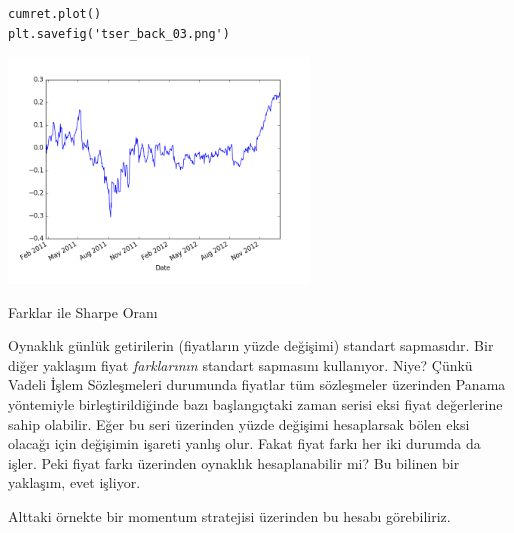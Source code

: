 \documentclass[12pt,fleqn]{article}\usepackage{../../common}
\begin{document}
\begin{verbatim}
cumret.plot()
plt.savefig('tser_back_03.png')
\end{verbatim}

\includegraphics[height=6cm]{tser_back_03.png}

Farklar ile Sharpe Oranı

Oynaklık günlük getirilerin (fiyatların yüzde değişimi) standart sapmasıdır. Bir
diğer yaklaşım fiyat {\em farklarının} standart sapmasını kullanıyor. Niye?
Çünkü Vadeli İşlem Sözleşmeleri durumunda fiyatlar tüm sözleşmeler üzerinden
Panama yöntemiyle birleştirildiğinde bazı başlangıçtaki zaman serisi eksi fiyat
değerlerine sahip olabilir. Eğer bu seri üzerinden yüzde değişimi hesaplarsak
bölen eksi olacağı için değişimin işareti yanlış olur. Fakat fiyat farkı her iki
durumda da işler. Peki fiyat farkı üzerinden oynaklık hesaplanabilir mi? Bu
bilinen bir yaklaşım, evet işliyor.

Alttaki örnekte bir momentum stratejisi üzerinden bu hesabı görebiliriz. 
\end{document}
